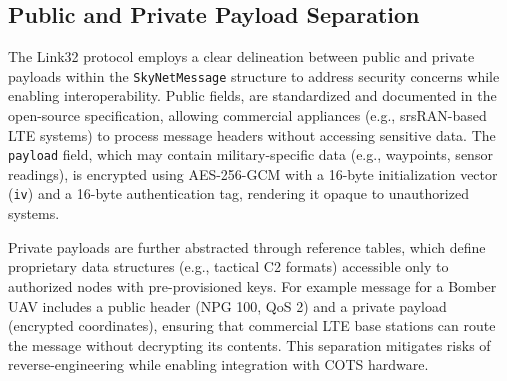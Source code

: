 \documentclass{article}
\begin{document}
\subsection{Public and Private Payload Separation}
The Link32 protocol employs a clear delineation between public and private payloads
within the \texttt{SkyNetMessage} structure to address security concerns while
enabling interoperability. Public fields, are standardized and documented in the open-source specification,
allowing commercial appliances (e.g., srsRAN-based LTE systems) to process message headers
without accessing sensitive data. The \texttt{payload} field, which may contain
military-specific data (e.g., waypoints, sensor readings), is encrypted
using AES-256-GCM with a 16-byte initialization vector (\texttt{iv}) and a 16-byte
authentication tag, rendering it opaque to unauthorized systems.

Private payloads are further abstracted through reference tables,
which define proprietary data structures (e.g., tactical C2 formats) accessible
only to authorized nodes with pre-provisioned keys. For example
message for a Bomber UAV includes a public header (NPG 100, QoS 2) and a private
payload (encrypted coordinates), ensuring that commercial LTE base stations can
route the message without decrypting its contents. This separation mitigates
risks of reverse-engineering while enabling integration with COTS hardware.
\end{document}
